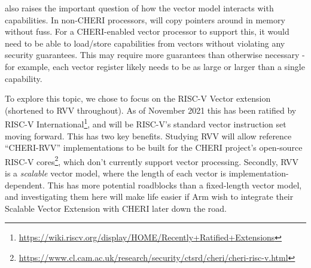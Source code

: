 \documentclass[../thesis]{subfiles}
\begin{document}
 also raises the important question of how the vector model interacts with capabilities.
In non-CHERI processors,  will copy pointers around in memory without fuss.
For a CHERI-enabled vector processor to support this, it would need to be able to load/store capabilities from vectors without violating any security guarantees.
This may require more guarantees than otherwise necessary - for example, each vector register likely needs to be as large or larger than a single capability.

To explore this topic, we chose to focus on the RISC-V Vector extension\cite{specification-RVV-v1.0} (shortened to RVV throughout).
As of November 2021 this has been ratified by RISC-V International\footnote{\url{https://wiki.riscv.org/display/HOME/Recently+Ratified+Extensions}}, and will be RISC-V's standard vector instruction set moving forward.
This has two key benefits.
Studying RVV will allow reference \enquote{CHERI-RVV} implementations to be built for the CHERI project's open-source RISC-V cores\footnote{\url{https://www.cl.cam.ac.uk/research/security/ctsrd/cheri/cheri-risc-v.html}}, which don't currently support vector processing.
Secondly, RVV is a \emph{scalable} vector model, where the length of each vector is implementation-dependent.
This has more potential roadblocks than a fixed-length vector model, and investigating them here will make life easier if Arm wish to integrate their Scalable Vector Extension with CHERI later down the road.

\end{document}

